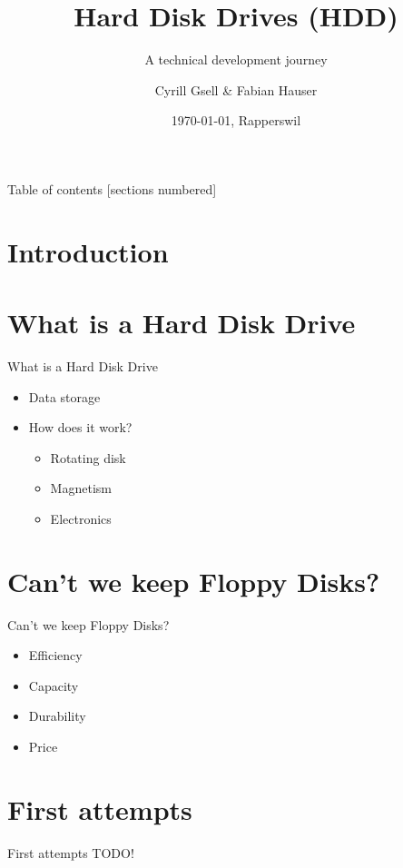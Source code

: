\documentclass[10pt]{beamer}
\title{Hard Disk Drives (HDD)}
\subtitle{A technical development journey}
\date{\today, Rapperswil}
\author{Cyrill Gsell \& Fabian Hauser}
\institute{Computer Science (Sofware Engineering) \\
	TecBEC Presentation FS 2016}
\newlength{\wideitemsep}
\let\olditem\item
\renewcommand{\item}{\setlength{\itemsep}{\wideitemsep}\olditem}
\begin{document}
\maketitle

\begin{frame}{Table of contents}
  [sections numbered]
  \tableofcontents[hideallsubsections]
\end{frame}

\section{Introduction}
\section{What is a Hard Disk Drive}
\begin{frame}[fragile]{What is a Hard Disk Drive}
	\begin{itemize}
		\item Data storage
		\item How does it work?
			\begin{itemize}
				\item Rotating disk
				\item Magnetism
				\item Electronics
			\end{itemize}
	\end{itemize}
\end{frame}

\section{Can't we keep Floppy Disks?}
\begin{frame}[fragile]{Can't we keep Floppy Disks?}
	\begin{itemize}
		\item Efficiency
		\item Capacity
		\item Durability
		\item Price
	\end{itemize}		
\end{frame}

\section{First attempts}
\begin{frame}[fragile]{First attempts}
	TODO!	
\end{frame}
\end{document}
